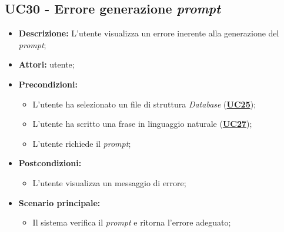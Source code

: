 \subsection{UC30 - Errore generazione \textit{prompt}}
\label{sec:UC30}
\begin{itemize}
	\item \textbf{Descrizione:} L’utente visualizza un errore inerente alla generazione del \textit{prompt};
	\item \textbf{Attori:} utente;
	\item \textbf{Precondizioni:} 
	\begin{itemize}
		\item L’utente ha selezionato un file di struttura \textit{Database} (\hyperref[sec:UC25]{\textbf{UC25}});
		\item L’utente ha scritto una frase in linguaggio naturale (\hyperref[sec:UC27]{\textbf{UC27}});
		\item L’utente richiede il \textit{prompt};
	\end{itemize}
	\item \textbf{Postcondizioni:} 
	\begin{itemize}
		\item L’utente visualizza un messaggio di errore;
	\end{itemize}
	\item \textbf{Scenario principale:} 
	\begin{itemize}
		\item Il sistema verifica il \textit{prompt} e ritorna l'errore adeguato;
	\end{itemize}
\end{itemize}

